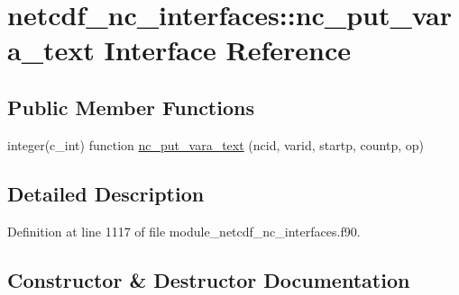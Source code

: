 \hypertarget{interfacenetcdf__nc__interfaces_1_1nc__put__vara__text}{}\section{netcdf\+\_\+nc\+\_\+interfaces\+:\+:nc\+\_\+put\+\_\+vara\+\_\+text Interface Reference}
\label{interfacenetcdf__nc__interfaces_1_1nc__put__vara__text}
\subsection*{Public Member Functions}
\begin{DoxyCompactItemize}
\item 
integer(c\+\_\+int) function \hyperlink{interfacenetcdf__nc__interfaces_1_1nc__put__vara__text_a93c42db90632e4ef0e90343c2d531e0f}{nc\+\_\+put\+\_\+vara\+\_\+text} (ncid, varid, startp, countp, op)
\end{DoxyCompactItemize}


\subsection{Detailed Description}


Definition at line 1117 of file module\+\_\+netcdf\+\_\+nc\+\_\+interfaces.\+f90.



\subsection{Constructor \& Destructor Documentation}
\mbox{\label{interfacenetcdf__nc__interfaces_1_1nc__put__vara__text_a93c42db90632e4ef0e90343c2d531e0f}} 
